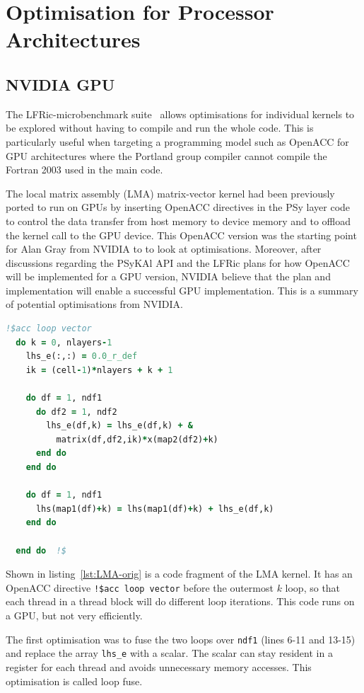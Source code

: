 \section{Optimisation for Processor Architectures
\label{sec:pa}}

\subsection{NVIDIA GPU}
The LFRic-microbenchmark suite~\cite{lfric-microbenchmarks} allows
optimisations for individual kernels to be explored without having to
compile and run the whole code. This is particularly useful when
targeting a programming model such as OpenACC for GPU architectures
where the Portland group compiler cannot compile the Fortran 2003 used 
in the main code.

The local matrix assembly (LMA) matrix-vector kernel had been
previously ported to run on GPUs by inserting OpenACC directives in
the PSy layer code to control the data transfer from host memory to
device memory and to offload the kernel call to the GPU device. This
OpenACC version was the starting point for Alan Gray from NVIDIA to
to look at optimisations. Moreover, after discussions regarding 
the PSyKAl API and the LFRic plans for how OpenACC will be
implemented for a GPU version, NVIDIA believe that the plan and
implementation will enable a successful GPU implementation.
This is a summary of potential optimisations from NVIDIA.

\begin{lstlisting}[language=Fortran,caption={Code fragment of original 
    kernel},label={lst:LMA-orig}]
  !$acc loop vector 
  do k = 0, nlayers-1
    lhs_e(:,:) = 0.0_r_def
    ik = (cell-1)*nlayers + k + 1

    do df = 1, ndf1
      do df2 = 1, ndf2
        lhs_e(df,k) = lhs_e(df,k) + & 
          matrix(df,df2,ik)*x(map2(df2)+k)
      end do
    end do

    do df = 1, ndf1
      lhs(map1(df)+k) = lhs(map1(df)+k) + lhs_e(df,k)
    end do

  end do  !$
\end{lstlisting}

Shown in listing~\ref{lst:LMA-orig} is a code fragment of the LMA
kernel. It has an OpenACC directive \verb+!$acc loop vector+ before the
outermost $k$ loop, so that each thread in a thread block will do different loop
iterations. This code runs on a GPU, but not very efficiently. 

The first optimisation was to fuse the two loops over \verb+ndf1+
(lines 6-11 and 13-15) and replace the array \verb+lhs_e+ with a
scalar. The scalar can stay resident in a register for each thread and
avoids unnecessary memory accesses. This optimisation is called loop
fuse. 


